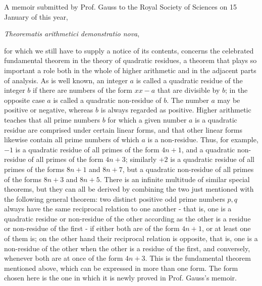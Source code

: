 \documentclass[12pt]{article}
\begin{document}
A memoir submitted by Prof. Gauss to the Royal Society of Sciences on 15 January of this year,
\begin{center}\textit{Theorematis arithmetici demonstratio nova},\end{center}
for which we still have to supply a notice of its contents, concerns the celebrated fundamental theorem in the theory of quadratic residues, a theorem that plays so important a role both in the whole of higher arithmetic and in the adjacent parts of analysis. As is well known, an integer $a$ is called a quadratic residue of the integer $b$ if there are numbers of the form $xx-a$ that are divisible by $b$; in the opposite case $a$ is called a quadratic non-residue of $b$. The number $a$ may be positive or negative, whereas $b$ is always regarded as positive. Higher arithmetic teaches that all prime numbers $b$ for which a given number $a$ is a quadratic residue are comprised under certain linear forms, and that other linear forms likewise contain all prime numbers of which $a$ is a non-residue. Thus, for example, $-1$ is a quadratic residue of all primes of the form $4n+1$, and a quadratic non-residue of all primes of the form $4n+3$; similarly $+2$ is a quadratic residue of all primes of the forms $8n+1$ and $8n+7$, but a quadratic non-residue of all primes of the forms $8n+3$ and $8n+5$. There is an infinite multitude of similar special theorems, but they can all be derived by combining the two just mentioned with the following general theorem: two distinct positive odd prime numbers $p,q$ always have the same reciprocal relation to one another - that is, one is a quadratic residue or non-residue of the other according as the other is a residue or non-residue of the first - if either both are of the form $4n+1$, or at least one of them is; on the other hand their reciprocal relation is opposite, that is, one is a non-residue of the other when the other is a residue of the first, and conversely, whenever both are at once of the form $4n+3$. This is the fundamental theorem mentioned above, which can be expressed in more than one form. The form chosen here is the one in which it is newly proved in Prof. Gauss's memoir.
\end{document}

